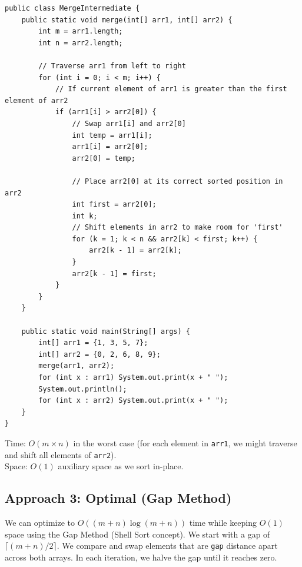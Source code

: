 \documentclass[12pt,a4paper,oneside]{book}
\begin{document}
\begin{lstlisting}[caption={Merge Without Extra Space --- Inline Insertion Sort, O(m $\times$ n) time O(1) space}]
public class MergeIntermediate {
    public static void merge(int[] arr1, int[] arr2) {
        int m = arr1.length;
        int n = arr2.length;

        // Traverse arr1 from left to right
        for (int i = 0; i < m; i++) {
            // If current element of arr1 is greater than the first element of arr2
            if (arr1[i] > arr2[0]) {
                // Swap arr1[i] and arr2[0]
                int temp = arr1[i];
                arr1[i] = arr2[0];
                arr2[0] = temp;

                // Place arr2[0] at its correct sorted position in arr2
                int first = arr2[0];
                int k;
                // Shift elements in arr2 to make room for 'first'
                for (k = 1; k < n && arr2[k] < first; k++) {
                    arr2[k - 1] = arr2[k];
                }
                arr2[k - 1] = first;
            }
        }
    }

    public static void main(String[] args) {
        int[] arr1 = {1, 3, 5, 7};
        int[] arr2 = {0, 2, 6, 8, 9};
        merge(arr1, arr2);
        for (int x : arr1) System.out.print(x + " ");
        System.out.println();
        for (int x : arr2) System.out.print(x + " ");
    }
}
\end{lstlisting}

\begin{complexity}
Time: $O(m \times n)$ in the worst case (for each element in \texttt{arr1}, we might traverse and shift all elements of \texttt{arr2}).\\
Space: $O(1)$ auxiliary space as we sort in-place.
\end{complexity}

\subsection{Approach 3: Optimal (Gap Method)}
We can optimize to $O((m+n)\log(m+n))$ time while keeping $O(1)$ space using the Gap Method (Shell Sort concept). We start with a gap of $\lceil (m+n)/2 \rceil$. We compare and swap elements that are \texttt{gap} distance apart across both arrays. In each iteration, we halve the gap until it reaches zero.
\end{document}
